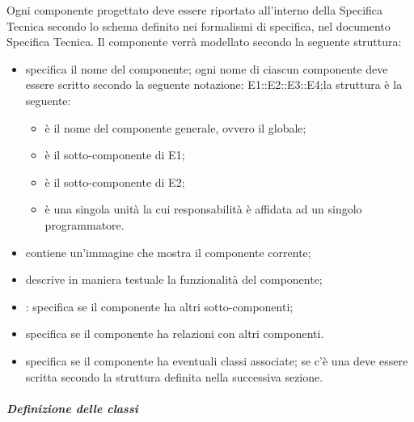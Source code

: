 Ogni componente progettato deve essere riportato all'interno della Specifica Tecnica secondo lo schema definito nei formalismi di specifica, nel documento Specifica Tecnica. Il componente verrà modellato secondo la seguente struttura:
\begin{itemize}
\item {}specifica il nome del componente; ogni nome di ciascun componente deve essere scritto secondo la seguente notazione: E1::E2::E3::E4;la struttura è la seguente:
\begin{itemize}
\item {}è il nome del componente generale, ovvero il  globale;
\item {}è il sotto-componente di E1;
\item {}è il sotto-componente di E2;
\item {}è una singola unità la cui responsabilità è affidata ad un singolo programmatore.
\end{itemize}
\item {}contiene un'immagine che mostra il componente corrente;
\item {}descrive in maniera testuale la funzionalità del componente;
\item {}: specifica se il componente ha altri sotto-componenti;
\item {} specifica se il componente ha relazioni con altri componenti.
\item {}specifica se il componente ha eventuali classi associate; se c'è una  deve essere scritta secondo la struttura definita nella successiva sezione.
\end{itemize}

\subparagraph{Definizione delle classi}

